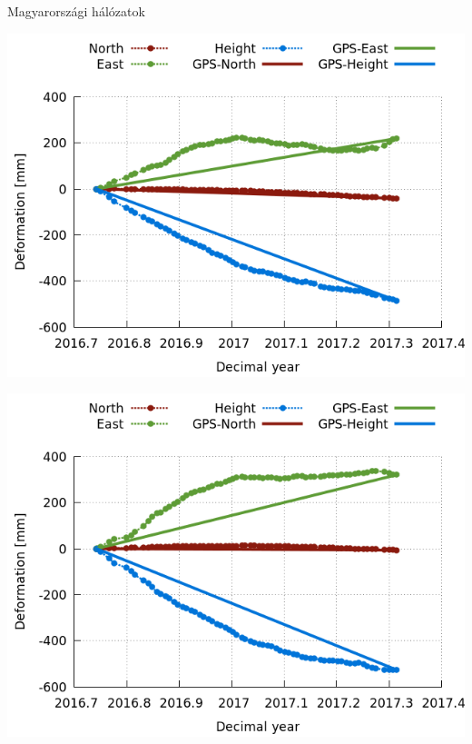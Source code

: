 \documentclass{beamer}
\begin{document}
\begin{frame}{Magyarországi hálózatok}

\begin{minipage}[c]{0.975\textwidth}
    \begin{minipage}[c]{0.475\textwidth}
        \includegraphics[width=\textwidth]{IB2-IB1_kalman.png}
    \end{minipage}
    \begin{minipage}[c]{0.475\textwidth}
        \includegraphics[width=\textwidth]{IB3-IB1_kalman.png}
    \end{minipage}
\end{minipage}
\begin{minipage}[c]{0.975\textwidth}
    \begin{minipage}[c]{0.475\textwidth}

\end{minipage}
\end{minipage}
\end{frame}
\end{document}
